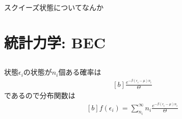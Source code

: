 \documentclass[../../master.tex]{subfiles}
\begin{document}
\begin{tcolorbox}[colbacktitle=white, coltitle=black, colback=white, title=おまけ3]
    スクイーズ状態についてなんか
\end{tcolorbox}


\clearpage
\section{統計力学: BEC}
\subsection{}
状態\(\epsilon_i\)の状態が\(n_i\)個ある確率は
\begin{equation}\begin{aligned}[b]
    \frac{e^{-\beta(\epsilon_i-\mu)n_i}}{\Theta}
\end{aligned}\end{equation}
であるので分布関数は
\begin{equation}\begin{aligned}[b]
    f(\epsilon_i) =\sum_{n_i}^{\infty}n_i \frac{e^{-\beta(\epsilon_i-\mu)n_i}}{\Theta}
\end{aligned}\end{equation}
\end{document}
